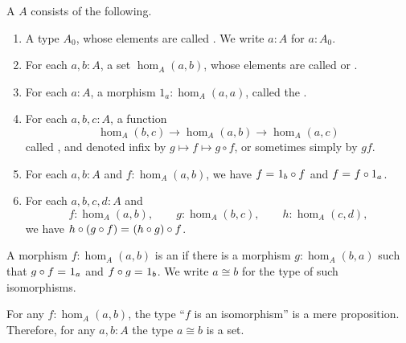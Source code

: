\documentclass[hott-all.tex]{subfiles}
\begin{document}
\begin{defn}\label{ct:precategory}
  A 
  $A$ consists of the following.
  \begin{enumerate}
  \item A type $A_0$, whose elements are called .%
    We write $a:A$ for $a:A_0$.
  \item For each $a,b:A$, a set $\hom_A(a,b)$, whose elements are called  or .%
  \item For each $a:A$, a morphism $1_a:\hom_A(a,a)$, called the .%
  \item For each $a,b,c:A$, a function%
    \[  \hom_A(b,c) \to \hom_A(a,b) \to \hom_A(a,c) \]
    called , and denoted infix by $g\mapsto f\mapsto g\circ f$, or sometimes simply by $gf$.
  \item For each $a,b:A$ and $f:\hom_A(a,b)$, we have $f =_{} 1_b\circ f$ and $f =_{} f\circ 1_a$.
  \item For each $a,b,c,d:A$ and
    \begin{equation*}
      f:\hom_A(a,b), \qquad
      g:\hom_A(b,c), \qquad
      h:\hom_A(c,d),
    \end{equation*}
    we have $h\circ (g\circ f) =_{} (h\circ g)\circ f$.
  \end{enumerate}
\end{defn}
%

\begin{defn}\label{ct:isomorphism}
  A morphism $f:\hom_A(a,b)$ is an 
  if there is a morphism $g:\hom_A(b,a)$ such that $g\circ f =_{} 1_a$ and $f\circ g =_{} 1_b$.
  We write $a\cong b$ for the type of such isomorphisms.
\end{defn}

\begin{lem}\label{ct:isoprop}
  For any $f:\hom_A(a,b)$, the type ``$f$ is an isomorphism'' is a mere proposition.
  Therefore, for any $a,b:A$ the type $a\cong b$ is a set.
\end{lem}
\end{document}
